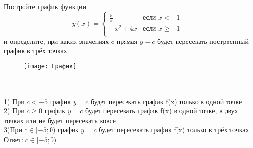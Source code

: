 \documentclass{article}
\begin{document}
	Постройте график функции\\
	\begin{equation*}
	y(x) = 
	\begin{cases}
	\frac{5}{x} &\text{если $x < -1$}\\
	-x^2+4x &\text{если $x \ge -1$}\\
	\end{cases}
	\end{equation*}
	и определите, при каких значениях c  прямая {$y=c$}   будет пересекать построенный график в трёх точках.\\
	\graphicspath{{Pictures/}}
	\begin{figure}[hb]
		\begin{center}
			\texttt{[image: График]}
		\end{center}
	\end{figure}
	\\
	\\
	1) При {$c<-5$} график  {$y=c$} будет пересекать график f(x) только в одной точке\\
	2) При {$c \geq 0$}  график  {$y=c$} будет пересекать график f(x) в одной точке, в двух точках или не будет пересекать вовсе\\
	3)При {$c \in [-5;0)$} график  {$y=c$} будет пересекать график f(x) только в трёх точках\\
	Ответ: {$c \in [-5;0)$}
	
\end{document}
